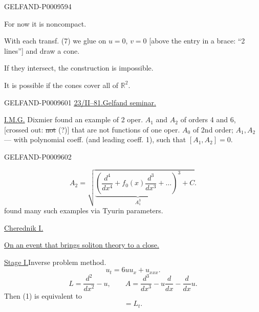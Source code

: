 \begin{GelfandAdjacentEvidence}{GELFAND-P000959}{4}


For now it is noncompact.

With each transf. (7) we glue on $u=0$, $v=0$ [above the entry in a brace: “2 lines”] and draw a cone.
\end{GelfandAdjacentEvidence}


If they intersect, the construction is impossible.

It is possible if the cones cover all of $\mathbb R^2$.

\begin{GelfandAdjacentEvidence}{GELFAND-P000960}{1}
\underline{\underline{23/\underline{II}--81.}}\quad \underline{Gelfand seminar.}

\underline{I.M.G.} Dixmier found an example of 2 oper. $A_1$ and $A_2$ of orders 4 and 6,
[crossed out: \sout{not} (?)] that are not functions of one oper. $A_0$ of 2nd order; $A_1,A_2$ --- with polynomial coeff. (and leading coeff. 1), such that $[A_1,A_2]=0$.
\end{GelfandAdjacentEvidence}
\begin{GelfandAdjacentEvidence}{GELFAND-P000960}{2}

\[
 A_2=\sqrt{\underbrace{\left(\frac{d^4}{dx^4}
 +f_0(x)\frac{d^3}{dx^3}+\ldots\right)^3}_{A_1^3}+C}.
\]
 found many such examples via Tyurin parameters.

\underline{Cherednik I.}

\underline{On an event that brings soliton theory to a close.}

\underline{Stage I.}\quad Inverse problem method.
\begin{equation*}
 u_t=6uu_x+u_{xxx}.\tag{1}
\end{equation*}
\begin{equation*}
 L=\frac{d^2}{dx^2}-u,\qquad
 A=\frac{d^3}{dx^3}-u\frac{d}{dx}-\frac{d}{dx}u.\tag{2}
\end{equation*}
Then (1) is equivalent to
\begin{equation*}
 [L,A]=L_t.\tag{3}
\end{equation*}
\end{GelfandAdjacentEvidence}
